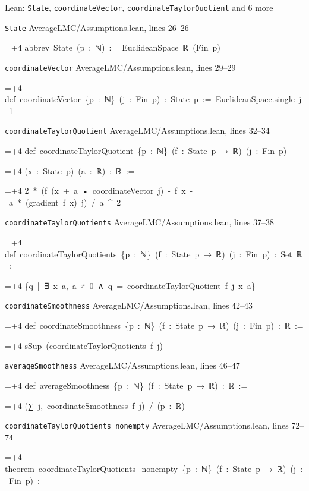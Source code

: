 \documentclass[11pt,a4paper]{report}
\newlength{\leancharwidth}
\newenvironment{leancode}{\par\smallskip\begingroup\ttfamily\footnotesize\raggedright
  \settowidth{\leancharwidth}{M}\setlength{\parskip}{0pt}\setlength{\parindent}{0pt}
  \frenchspacing}{\par\endgroup\smallskip}
\newcommand{\leanline}[2]{\hangindent=\dimexpr#1\leancharwidth+4\leancharwidth\relax
  \hangafter=1\noindent\hspace*{#1\leancharwidth}#2\par}
\newcommand{\leansource}[1]{\par{\footnotesize\color{leanmuted}#1}\par}
\begin{document}
\begin{leanbox}{Lean: \texttt{State}, \texttt{coordinateVector}, \texttt{coordinateTaylorQuotient} and 6 more}
\leansource{\texttt{State} \quad AverageLMC/\allowbreak{}Assumptions.lean, lines 26–26}
\begin{leancode}
\leanline{0}{abbrev\ State\ (p\ :\ ℕ)\ :=\ EuclideanSpace\ ℝ\ (Fin\ p)}
\end{leancode}
\leansource{\texttt{coordinateVector} \quad AverageLMC/\allowbreak{}Assumptions.lean, lines 29–29}
\begin{leancode}
\leanline{0}{def\ coordinateVector\ \{p\ :\ ℕ\}\ (j\ :\ Fin\ p)\ :\ State\ p\ :=\ EuclideanSpace.single\ j\ 1}
\end{leancode}
\leansource{\texttt{coordinateTaylorQuotient} \quad AverageLMC/\allowbreak{}Assumptions.lean, lines 32–34}
\begin{leancode}
\leanline{0}{def\ coordinateTaylorQuotient\ \{p\ :\ ℕ\}\ (f\ :\ State\ p\ →\ ℝ)\ (j\ :\ Fin\ p)}
\leanline{4}{(x\ :\ State\ p)\ (a\ :\ ℝ)\ :\ ℝ\ :=}
\leanline{2}{2\ *\ (f\ (x\ +\ a\ •\ coordinateVector\ j)\ -\ f\ x\ -\ a\ *\ (gradient\ f\ x)\ j)\ /\ a\ \textasciicircum{}\ 2}
\end{leancode}
\leansource{\texttt{coordinateTaylorQuotients} \quad AverageLMC/\allowbreak{}Assumptions.lean, lines 37–38}
\begin{leancode}
\leanline{0}{def\ coordinateTaylorQuotients\ \{p\ :\ ℕ\}\ (f\ :\ State\ p\ →\ ℝ)\ (j\ :\ Fin\ p)\ :\ Set\ ℝ\ :=}
\leanline{2}{\{q\ |\ ∃\ x\ a,\ a\ ≠\ 0\ ∧\ q\ =\ coordinateTaylorQuotient\ f\ j\ x\ a\}}
\end{leancode}
\leansource{\texttt{coordinateSmoothness} \quad AverageLMC/\allowbreak{}Assumptions.lean, lines 42–43}
\begin{leancode}
\leanline{0}{def\ coordinateSmoothness\ \{p\ :\ ℕ\}\ (f\ :\ State\ p\ →\ ℝ)\ (j\ :\ Fin\ p)\ :\ ℝ\ :=}
\leanline{2}{sSup\ (coordinateTaylorQuotients\ f\ j)}
\end{leancode}
\leansource{\texttt{averageSmoothness} \quad AverageLMC/\allowbreak{}Assumptions.lean, lines 46–47}
\begin{leancode}
\leanline{0}{def\ averageSmoothness\ \{p\ :\ ℕ\}\ (f\ :\ State\ p\ →\ ℝ)\ :\ ℝ\ :=}
\leanline{2}{(∑\ j,\ coordinateSmoothness\ f\ j)\ /\ (p\ :\ ℝ)}
\end{leancode}
\leansource{\texttt{coordinateTaylorQuotients\_\allowbreak{}nonempty} \quad AverageLMC/\allowbreak{}Assumptions.lean, lines 72–74}
\begin{leancode}
\leanline{0}{theorem\ coordinateTaylorQuotients\_nonempty\ \{p\ :\ ℕ\}\ (f\ :\ State\ p\ →\ ℝ)\ (j\ :\ Fin\ p)\ :}

\end{leancode}
\end{leanbox}
\end{document}
